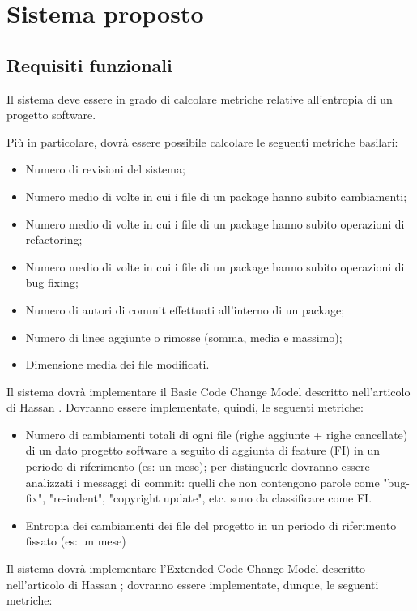 \chapter{Sistema proposto}
\section{Requisiti funzionali}\label{req_fun}
Il sistema deve essere in grado di calcolare metriche relative all'entropia di un progetto software.

Più in particolare, dovrà essere possibile calcolare le seguenti metriche basilari:
\begin{itemize}
\item Numero di revisioni del sistema;
\item Numero medio di volte in cui i file di un package hanno subito
cambiamenti;
\item Numero medio di volte in cui i file di un package hanno subito operazioni
di refactoring;
\item Numero medio di volte in cui i file di un package hanno subito operazioni di
bug fixing;
\item Numero di autori di commit effettuati all’interno di un package;
\item Numero di linee aggiunte o rimosse (somma, media e massimo);
\item Dimensione media dei file modificati.
\end{itemize}

Il sistema dovrà implementare il Basic Code Change Model descritto nell'articolo di Hassan \cite{hassan2009predicting}. Dovranno essere implementate, quindi, le seguenti metriche:
\begin{itemize}
\item Numero di cambiamenti totali di ogni file (righe aggiunte + righe cancellate) di un dato progetto software a seguito di aggiunta di feature (FI) in un periodo di riferimento (es: un mese); per distinguerle dovranno essere analizzati i messaggi di commit: quelli che non contengono parole come "bug-fix", "re-indent", "copyright update", etc. sono da classificare come FI.
\item Entropia dei cambiamenti dei file del progetto in un periodo di riferimento fissato (es: un mese)
\end{itemize}

Il sistema dovrà implementare l'Extended Code Change Model descritto nell'articolo di Hassan \cite{hassan2009predicting}; dovranno essere implementate, dunque, le seguenti metriche:
